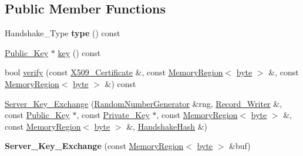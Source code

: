 \subsection*{Public Member Functions}
\begin{DoxyCompactItemize}
\item 
\hypertarget{classBotan_1_1Server__Key__Exchange_a5ec6e7da09feb7397c3aa9b68232727a}{Handshake\-\_\-\-Type {\bfseries type} () const }\label{classBotan_1_1Server__Key__Exchange_a5ec6e7da09feb7397c3aa9b68232727a}

\item 
\hyperlink{classBotan_1_1Public__Key}{Public\-\_\-\-Key} $\ast$ \hyperlink{classBotan_1_1Server__Key__Exchange_ab354a0c5eeb64a95345300589ef1a997}{key} () const 
\item 
bool \hyperlink{classBotan_1_1Server__Key__Exchange_ab50968c8a7a306bd2f9bf5148fd5f933}{verify} (const \hyperlink{classBotan_1_1X509__Certificate}{X509\-\_\-\-Certificate} \&, const \hyperlink{classBotan_1_1MemoryRegion}{Memory\-Region}$<$ \hyperlink{namespaceBotan_a7d793989d801281df48c6b19616b8b84}{byte} $>$ \&, const \hyperlink{classBotan_1_1MemoryRegion}{Memory\-Region}$<$ \hyperlink{namespaceBotan_a7d793989d801281df48c6b19616b8b84}{byte} $>$ \&) const 
\item 
\hyperlink{classBotan_1_1Server__Key__Exchange_a97b2caac0f7bb617156ef2f23c51a9f0}{Server\-\_\-\-Key\-\_\-\-Exchange} (\hyperlink{classBotan_1_1RandomNumberGenerator}{Random\-Number\-Generator} \&rng, \hyperlink{classBotan_1_1Record__Writer}{Record\-\_\-\-Writer} \&, const \hyperlink{classBotan_1_1Public__Key}{Public\-\_\-\-Key} $\ast$, const \hyperlink{classBotan_1_1Private__Key}{Private\-\_\-\-Key} $\ast$, const \hyperlink{classBotan_1_1MemoryRegion}{Memory\-Region}$<$ \hyperlink{namespaceBotan_a7d793989d801281df48c6b19616b8b84}{byte} $>$ \&, const \hyperlink{classBotan_1_1MemoryRegion}{Memory\-Region}$<$ \hyperlink{namespaceBotan_a7d793989d801281df48c6b19616b8b84}{byte} $>$ \&, \hyperlink{classBotan_1_1HandshakeHash}{Handshake\-Hash} \&)
\item 
\hypertarget{classBotan_1_1Server__Key__Exchange_a7f3ed830935e1d4d44b5251bbb409378}{{\bfseries Server\-\_\-\-Key\-\_\-\-Exchange} (const \hyperlink{classBotan_1_1MemoryRegion}{Memory\-Region}$<$ \hyperlink{namespaceBotan_a7d793989d801281df48c6b19616b8b84}{byte} $>$ \&buf)}\label{classBotan_1_1Server__Key__Exchange_a7f3ed830935e1d4d44b5251bbb409378}

\end{DoxyCompactItemize}


